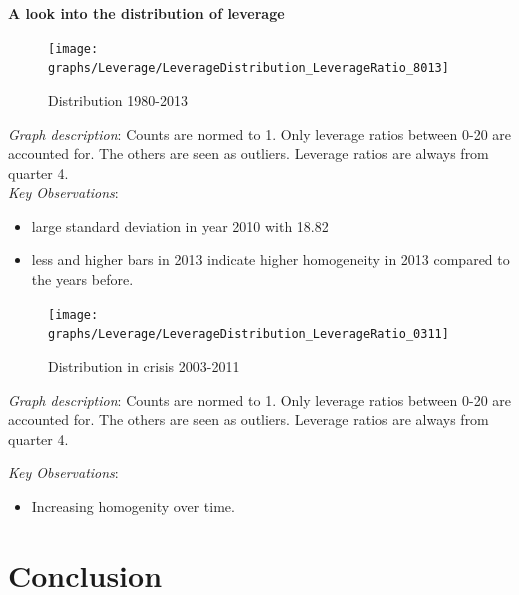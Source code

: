 \documentclass[12pt, a4paper]{article} %
\begin{document}
\textbf{A look into the distribution of leverage}\\



\begin{figure}[hbtp]
\centering
\caption{Distribution 1980-2013}
\texttt{[image: graphs/Leverage/LeverageDistribution\_LeverageRatio\_8013]}
\end{figure}

\noindent \textit{Graph description}: Counts are normed to 1. Only leverage ratios between 0-20 are accounted for. The others are seen as outliers. Leverage ratios are always from quarter 4.
\\

\noindent \textit{Key Observations}:
\begin{itemize}
\item large standard deviation in year 2010 with 18.82
\item less and higher bars in 2013 indicate higher homogeneity in 2013 compared to the years before.
\end{itemize}

\pagebreak


\begin{figure}[hbtp]
\centering
\caption{Distribution in crisis 2003-2011}
\texttt{[image: graphs/Leverage/LeverageDistribution\_LeverageRatio\_0311]}
\end{figure}

\noindent \textit{Graph description}: Counts are normed to 1. Only leverage ratios between 0-20 are accounted for. The others are seen as outliers. Leverage ratios are always from quarter 4.

\noindent \textit{Key Observations}:
\begin{itemize}
\item Increasing homogenity over time.
\end{itemize}


\section{Conclusion}





\newpage
\printbibliography[
heading=bibintoc,
title={Bibliography}
]



\end{document}
